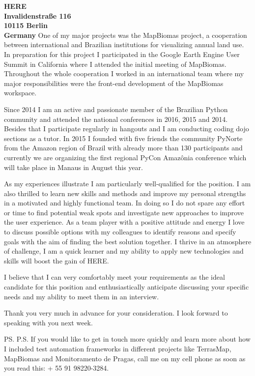 \documentclass[a4paper]{joaosoares-letter}
\begin{document}
\begin{letter}{\bfseries HERE\\Invalidenstraße 116\\10115 Berlin\\Germany}
One of my major projects was the MapBiomas project, a cooperation between international and Brazilian institutions for visualizing annual land use. In preparation for this project I participated in the Google Earth Engine User Summit in California where I attended the initial meeting of MapBiomas. Throughout the whole cooperation I worked in an international team where my major responsibilities were the front-end development of the MapBiomas workspace.

Since 2014 I am an active and passionate member of the Brazilian Python community and attended the national conferences in 2016, 2015 and 2014. Besides that I participate regularly in hangouts and I am conducting coding dojo sections as a tutor. In 2015 I founded with five friends the community PyNorte  from the Amazon region of Brazil with already more than 130 participants and currently we are organizing the first regional PyCon Amazônia conference which will take place in Manaus in August this year.

As my experiences illustrate I am particularly well-qualified for the position. I am also thrilled to learn new skills and methods and improve my personal strengths in a motivated and highly functional team. In doing so I do not spare any effort or time to find potential weak spots and investigate new approaches to improve the user experience. As a team player with a positive attitude and energy I love to discuss possible options with my colleagues to identify reasons and specify goals with the aim of finding the best solution together. I thrive in an atmosphere of challenge, I am a quick learner and my ability to apply new technologies and skills will boost the gain of HERE.

I believe that I can very comfortably meet your requirements as the ideal candidate for this position and enthusiastically anticipate discussing your specific needs and my ability to meet them in an interview.


\closing{Thank you very much in advance for your consideration. I look forward to speaking with you next week.}
\vspace{10pt}
\ps
P.S. If you would like to get in touch more quickly and learn more about how I included test automation frameworks in different projects like TerrasMap, MapBiomas and Monitoramento de Pragas, call me on my cell phone as soon as you read this: + 55 91 98220-3284.
\vspace{\fill}

\end{letter}
\end{document}
